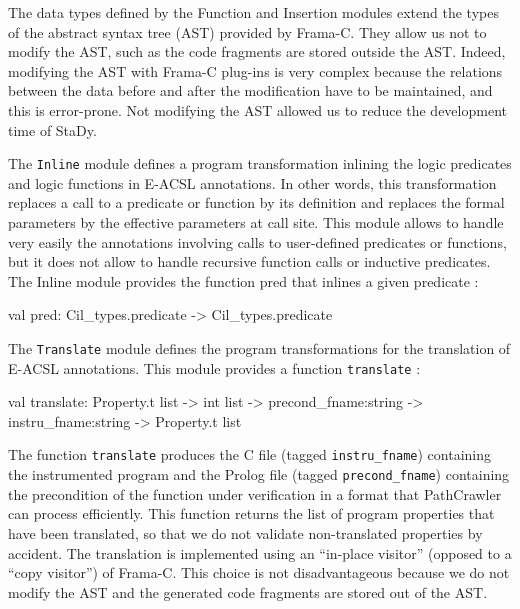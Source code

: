 \documentclass[web]{frama-c-book}
\begin{document}
The data types defined by the Function and Insertion modules extend the types of the abstract syntax tree (AST) provided by Frama-C. They allow us not to modify the AST, such as the code fragments are stored outside the AST. Indeed, modifying the AST with Frama-C plug-ins is very complex because the relations between the data before and after the modification have to be maintained, and this is error-prone. Not modifying the AST allowed us to reduce the development time of StaDy.

The \lstinline[language=OCaml]'Inline' module defines a program transformation inlining the logic predicates and logic functions in E-ACSL annotations. In other words, this transformation replaces a call to a predicate or function by its definition and replaces the formal parameters by the effective parameters at call site. This module allows to  handle very easily the annotations involving calls to user-defined predicates or functions, but it does not allow to handle recursive function calls or inductive predicates. The Inline module provides the function pred that inlines a given predicate :

\begin{ocamlcode}
  val pred: Cil_types.predicate -> Cil_types.predicate
\end{ocamlcode}

The \lstinline[language=OCaml]'Translate' module defines the program transformations for the translation of E-ACSL annotations. This module provides a function \lstinline[language=OCaml]'translate' :

\begin{ocamlcode}
  val translate:
    Property.t list -> int list -> precond_fname:string -> instru_fname:string
    -> Property.t list
\end{ocamlcode}

The function \lstinline[language=OCaml]'translate' produces the C file (tagged \lstinline[language=OCaml]'instru_fname') containing the instrumented program and the Prolog file (tagged \lstinline[language=OCaml]'precond_fname') containing the precondition of the function under verification in a format that PathCrawler can process efficiently. This function returns the list of program properties that have been translated, so that we do not validate non-translated properties by accident. The translation is implemented using an ``in-place visitor'' (opposed to a ``copy visitor'') of Frama-C. This choice is not disadvantageous because we do not modify the AST and the generated code fragments are stored out of the AST.
\end{document}
